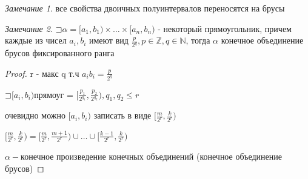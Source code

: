 \documentclass[a4paper, 12pt]{article}
\newcommand\letsymbol{\mathord{\sqsupset}}
\theoremstyle{definition}
\theoremstyle{remark}
\newtheorem*{remark}{Замечание}
\begin{document}
\begin{remark}
     все свойства двоичных полуинтервалов переносятся на брусы
\end{remark}
\begin{remark}
     $\letsymbol{}\alpha = [a_1, b_1)\times\dots\times[a_n, b_n)$ - некоторый прямоугольник, причем каждые из чисел $a_i, b_i$ имеют вид $\frac{p}{2^q}, p\in\mathbb{Z}, q\in\mathbb{N}$, тогда
     $\alpha$ конечное объединение брусов фиксированного ранга
\end{remark}
     \begin{proof}
          r - макс q т.ч $a_ib_i = \frac{p}{2^q}$

          $\letsymbol[a_i, b_i)$прямоуг = $[\frac{p_1}{2^{q_1}}, \frac{p_2}{2^{q_2}}), q_1, q_2\leq r$

          очевидно можно $[a_i, b_i)$ записать в виде $[\frac{m}{2^r}, \frac{k}{2^r})$

          $[\frac{m}{2^r}, \frac{k}{2^r}) = [\frac{m}{2^r}, \frac{m+1}{2^r})\cup\dots\cup[\frac{k-1}{2^r}, \frac{k}{2^r})$

          $\alpha - $конечное произведение конечных объединений (конечное объединение брусов)
     \end{proof}
\end{document}

